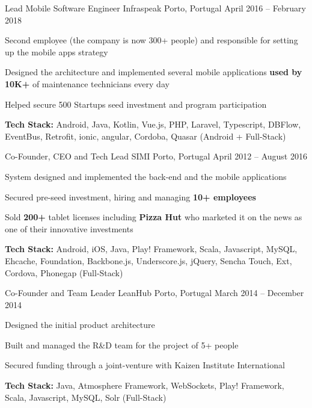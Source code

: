 \documentclass[]{awesome-cv}
\begin{document}
\begin{cventries}
	\vspace{-4mm}
	\cventry
	{Lead Mobile Software Engineer}
	{Infraspeak}
	{Porto, Portugal}
	{April 2016 – February 2018}
	{\begin{cvitems}
		\item {Second employee (the company is now 300+ people) and responsible for setting up the mobile apps strategy}
		\item {Designed the architecture and implemented several mobile applications \textbf{used by 10K+} of maintenance technicians every day}
		\item {Helped secure 500 Startups seed investment and program participation}
		\item {\textbf{Tech Stack:} Android, Java, Kotlin, Vue.js, PHP, Laravel, Typescript, DBFlow, EventBus, Retrofit, ionic, angular, Cordoba, Quasar (Android + Full-Stack)}
		\end{cvitems}}

	\vspace{-4mm}
	\cventry
	{Co-Founder, CEO and Tech Lead}
	{SIMI}
	{Porto, Portugal}
	{April 2012 – August 2016}
	{\begin{cvitems}
		\item {System designed and implemented the back-end and the mobile applications}
		\item {Secured pre-seed investment, hiring and managing \textbf{10+ employees}}
		\item {Sold \textbf{200+} tablet licenses including \textbf{Pizza Hut} who marketed it on the news as one of their innovative investments}
		\item {\textbf{Tech Stack:} Android, iOS, Java, Play! Framework, Scala, Javascript, MySQL, Ehcache, Foundation, Backbone.js, Underscore.js, jQuery, Sencha Touch, Ext, Cordova, Phonegap (Full-Stack)}
		\end{cvitems}}

	\vspace{-4mm}
	\cventry
	{Co-Founder and Team Leader}
	{LeanHub}
	{Porto, Portugal}
	{March 2014 – December 2014}
	{\begin{cvitems}
		\item {Designed the initial product architecture}
		\item {Built and managed the R\&D team for the project of 5+ people}
		\item {Secured funding through a joint-venture with Kaizen Institute International}
		\item {\textbf{Tech Stack:} Java, Atmosphere Framework, WebSockets, Play! Framework, Scala, Javascript, MySQL, Solr (Full-Stack)}
		\end{cvitems}}


\end{cventries}
\end{document}

